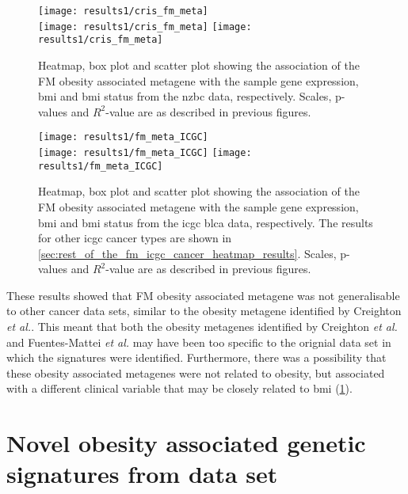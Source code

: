 \begin{figure}[htp!]
	\centering
	\texttt{[image: results1/cris\_fm\_meta]}\\
	\texttt{[image: results1/cris\_fm\_meta]}
	\hfill
	\texttt{[image: results1/cris\_fm\_meta]}
	\caption[FM metagene in the \gls{nzbc} data]{Heatmap, box plot and scatter plot showing the association of the FM obesity associated metagene with the sample gene expression, \gls{bmi} and \gls{bmi} status from the \gls{nzbc} data, respectively.
	Scales, p-values and $R^2$-value are as described in previous figures.}
	\label{fig:fmmetacris}
\end{figure}

\begin{figure}[htp!]
	\centering
	\texttt{[image: results1/fm\_meta\_ICGC]}\\
	\texttt{[image: results1/fm\_meta\_ICGC]}
	\hfill
	\texttt{[image: results1/fm\_meta\_ICGC]}
	\caption[FM obesity metagene in the \acrshort{icgc} \acrshort{blca} data]{Heatmap, box plot and scatter plot showing the association of the FM obesity associated metagene with the sample gene expression, \gls{bmi} and \gls{bmi} status from the \acrshort{icgc} \acrshort{blca} data, respectively.
	The results for other \gls{icgc} cancer types are shown in \cref{sec:rest_of_the_fm_icgc_cancer_heatmap_results}.
	Scales, p-values and $R^2$-value are as described in previous figures.}
	\label{fig:fmmetaicgc}
\end{figure}

\noindent
These results showed that FM obesity associated metagene was not generalisable to other cancer data sets, similar to the obesity metagene identified by Creighton \textit{et al.}.
This meant that both the obesity metagenes identified by Creighton \textit{et al.} and Fuentes-Mattei \textit{et al.} may have been too specific to the orignial data set in which the signatures were identified.
Furthermore, there was a possibility that these obesity associated metagenes were not related to obesity, but associated with a different clinical variable that may be closely related to \gls{bmi} (\cref{sec:creighton_obesity_metagene_new}).

\section{Novel obesity associated genetic signatures from \citet{Creighton2012} data set}
\label{sec:creighton_obesity_metagene_new}

